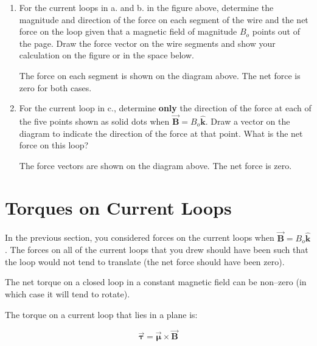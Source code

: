 \documentclass{article}
\newcommand{\khat}[0]{\hat{\boldsymbol{k}}}
\newcommand{\bfvec}[1]{\vec{\mathbf{#1}}}
\begin{document}
\begin{enumerate}

  \item For the current loops in a. and b. in the figure above, determine the magnitude and direction of the force on each segment of the wire and the net force on the loop given that a magnetic field of magnitude $B_o$ points out of the page. Draw the force vector on the wire segments and show your calculation on the figure or in the space below.

        \ifsolutions
        The force on each segment is shown on the diagram above. The net force is zero for both cases.
        \else
        \vskip 169.5pt
        \fi

  \item For the current loop in c., determine {\bf only} the direction of the force at each of the five points shown as solid dots when $\bfvec{B}=B_o\khat$. Draw a vector on the diagram to indicate the direction of the force at that point. What is the net force on this loop?

        \ifsolutions
        The force vectors are shown on the diagram above. The net force is zero.
        \else

        \newpage
        \fi

\end{enumerate}

\section{Torques on Current Loops}

In the previous section, you considered forces on the current loops when $\bfvec{B}=B_o\khat$. The forces on all of the current loops that you drew should have been such that the loop would not tend to translate (the net force should have been zero). 


The net torque on a closed loop in a constant magnetic field can be non--zero (in which case it will tend to rotate).

The torque on a current loop that lies in a plane is:

$$\vec{\boldsymbol{\tau}} = \vec{\boldsymbol{\mu}}\times\bfvec{B}$$
\end{document}
